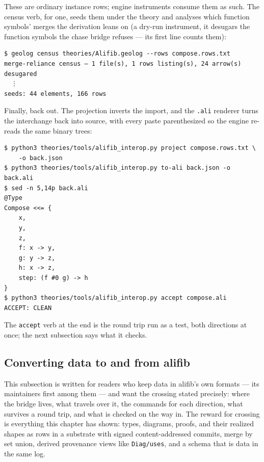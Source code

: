 \noindent These are ordinary instance rows; engine instruments consume
them as such. The census verb, for one, seeds them under the theory
and analyses which function symbols' merges the derivation leans on
(a dry-run instrument, it desugars the function symbols the chase
bridge refuses --- its first line counts them):

\begin{Verbatim}[fontsize=\small,frame=leftline,rulecolor=\color{accentmid},framesep=3mm,xleftmargin=3mm]
$ geolog census theories/Alifib.geolog --rows compose.rows.txt
merge-reliance census — 1 file(s), 1 rows listing(s), 24 arrow(s) desugared
  ⋮
seeds: 44 elements, 166 rows
\end{Verbatim}

Finally, back out. The projection inverts the import, and the
\texttt{.ali} renderer turns the interchange back into source, with
every paste parenthesized so the engine re-reads the same binary
trees:

\begin{Verbatim}[fontsize=\small,frame=leftline,rulecolor=\color{accentmid},framesep=3mm,xleftmargin=3mm]
$ python3 theories/tools/alifib_interop.py project compose.rows.txt \
    -o back.json
$ python3 theories/tools/alifib_interop.py to-ali back.json -o back.ali
$ sed -n 5,14p back.ali
@Type
Compose <<= {
    x,
    y,
    z,
    f: x -> y,
    g: y -> z,
    h: x -> z,
    step: (f #0 g) -> h
}
$ python3 theories/tools/alifib_interop.py accept compose.ali
ACCEPT: CLEAN
\end{Verbatim}

\noindent The \texttt{accept} verb at the end is the round trip run as
a test, both directions at once; the next subsection says what it
checks.

\subsection{Converting data to and from alifib}
\label{sec:gt-alifib-convert}

This subsection is written for readers who keep data in alifib's own
formats --- its maintainers first among them --- and want the crossing
stated precisely: where the bridge lives, what travels over it, the
commands for each direction, what survives a round trip, and what is
checked on the way in. The reward for crossing is everything this
chapter has shown: types, diagrams, proofs, and their realized shapes
as rows in a substrate with signed content-addressed commits, merge by
set union, derived provenance views like \texttt{Diag/uses}, and a
schema that is data in the same log.

